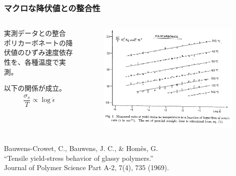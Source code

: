 \documentclass[1４pt, dvipdfmx]{beamer}
\begin{document}
\begin{frame}
\frametitle{マクロな降伏値との整合性}


\begin{columns}[totalwidth=1\textwidth]

\begin{block}{実測データとの整合}
ポリカーボネートの降伏値のひずみ速度依存性を、各種温度で実測。

以下の関係が成立。
\begin{align*}
\dfrac{\sigma_s}{T} 
	\propto \log \dot{\epsilon}
\end{align*}
\end{block}

	\begin{figure}
	\centering
	\includegraphics[width=\textwidth]{fig2.png}
	\end{figure}
%

\end{columns}
Bauwens-Crowet, C., Bauwens, J. C., \& Homès, G. \\
``Tensile yield-stress behavior of glassy polymers.''\\
Journal of Polymer Science Part A-2, 7(4), 735 (1969). 
\end{frame}
\end{document}
